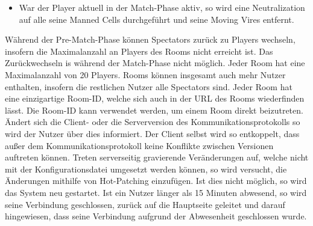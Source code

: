 \begin{description}
\begin{itemize}
			\item War der Player aktuell in der Match-Phase aktiv, so wird eine Neutralization auf alle seine Manned Cells durchgeführt und seine Moving Vires entfernt.
		\end{itemize}
		Während der Pre-Match-Phase können Spectators zurück zu Players wechseln, insofern die Maximalanzahl an Players des Rooms nicht erreicht ist. Das Zurückwechseln is während der Match-Phase nicht möglich.
		Jeder Room hat eine Maximalanzahl von 20 Players. Rooms können insgesamt auch mehr Nutzer enthalten, insofern die restlichen Nutzer alle Spectators sind.
		Jeder Room hat eine einzigartige Room-ID, welche sich auch in der URL des Rooms wiederfinden lässt. Die Room-ID kann verwendet werden, um einem Room direkt beizutreten.
		Ändert sich die Client- oder die Serverversion des Kommunikationsprotokolls so wird der Nutzer über dies informiert. Der Client selbst wird so entkoppelt, dass außer dem Kommunikationsprotokoll keine Konflikte zwischen Versionen auftreten können. Treten serverseitig gravierende Veränderungen auf, welche nicht mit der Konfigurationsdatei umgesetzt werden können, so wird versucht, die Änderungen mithilfe von Hot-Patching einzufügen. Ist dies nicht möglich, so wird das System neu gestartet.
		Ist ein Nutzer länger als 15 Minuten abwesend, so wird seine Verbindung geschlossen, zurück auf die Hauptseite geleitet und darauf hingewiesen, dass seine Verbindung aufgrund der Abwesenheit geschlossen wurde.
\end{description}

